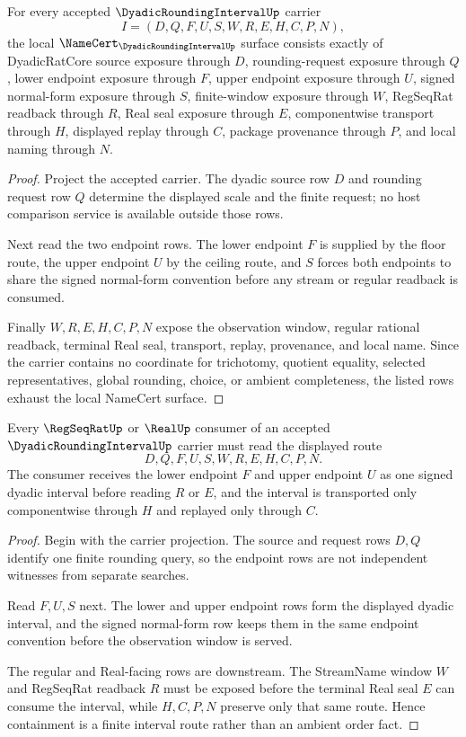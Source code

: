 \begin{theorem}
\label{thm:dyadic-rounding-interval-namecert-obligations}
For every accepted $\DyadicRoundingIntervalUp$ carrier
$$
I=(D,Q,F,U,S,W,R,E,H,C,P,N),
$$
the local $\NameCert_{\DyadicRoundingIntervalUp}$ surface consists exactly of DyadicRatCore source exposure through $D$, rounding-request exposure through $Q$, lower endpoint exposure through $F$, upper endpoint exposure through $U$, signed normal-form exposure through $S$, finite-window exposure through $W$, RegSeqRat readback through $R$, Real seal exposure through $E$, componentwise transport through $H$, displayed replay through $C$, package provenance through $P$, and local naming through $N$.
\end{theorem}
\begin{proof}
Project the accepted carrier. The dyadic source row $D$ and rounding request row $Q$ determine the displayed scale and the finite request; no host comparison service is available outside those rows.

Next read the two endpoint rows. The lower endpoint $F$ is supplied by the floor route, the upper endpoint $U$ by the ceiling route, and $S$ forces both endpoints to share the signed normal-form convention before any stream or regular readback is consumed.

Finally $W,R,E,H,C,P,N$ expose the observation window, regular rational readback, terminal Real seal, transport, replay, provenance, and local name. Since the carrier contains no coordinate for trichotomy, quotient equality, selected representatives, global rounding, choice, or ambient completeness, the listed rows exhaust the local NameCert surface.
\end{proof}

\begin{theorem}
\label{thm:dyadic-rounding-interval-containment-route}
Every $\RegSeqRatUp$ or $\RealUp$ consumer of an accepted $\DyadicRoundingIntervalUp$ carrier must read the displayed route
$$
D,Q,F,U,S,W,R,E,H,C,P,N .
$$
The consumer receives the lower endpoint $F$ and upper endpoint $U$ as one signed dyadic interval before reading $R$ or $E$, and the interval is transported only componentwise through $H$ and replayed only through $C$.
\end{theorem}
\begin{proof}
Begin with the carrier projection. The source and request rows $D,Q$ identify one finite rounding query, so the endpoint rows are not independent witnesses from separate searches.

Read $F,U,S$ next. The lower and upper endpoint rows form the displayed dyadic interval, and the signed normal-form row keeps them in the same endpoint convention before the observation window is served.

The regular and Real-facing rows are downstream. The StreamName window $W$ and RegSeqRat readback $R$ must be exposed before the terminal Real seal $E$ can consume the interval, while $H,C,P,N$ preserve only that same route. Hence containment is a finite interval route rather than an ambient order fact.
\end{proof}

